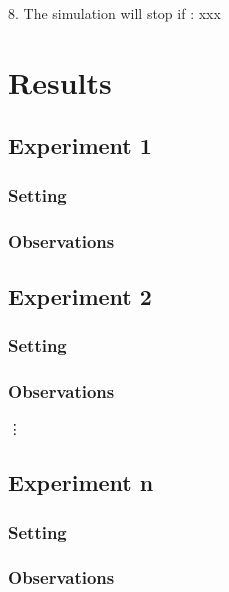 \documentclass[11pt]{article}
\begin{document}
	8. The simulation will stop if : xxx
	
\section{Results}

\subsection{Experiment 1}

\subsubsection{Setting}
	
\subsubsection{Observations}

\subsection{Experiment 2}

\subsubsection{Setting}

\subsubsection{Observations}

\vdots

\subsection{Experiment n}

\subsubsection{Setting}

\subsubsection{Observations}
\end{document}
